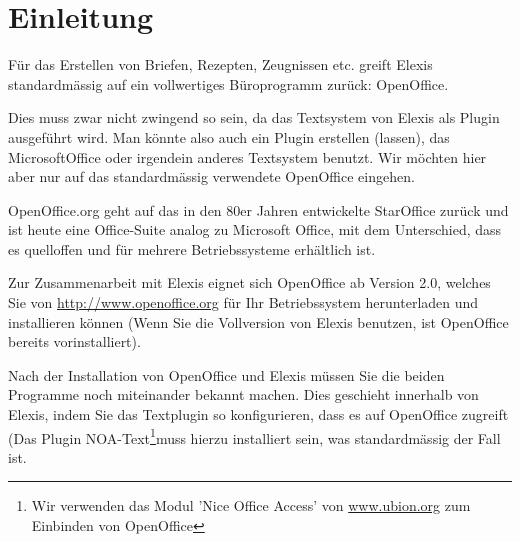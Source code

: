 
\section{Einleitung}
Für das Erstellen von Briefen, Rezepten, Zeugnissen etc. greift Elexis
standardmässig auf ein vollwertiges Büroprogramm zurück: OpenOffice.

Dies muss zwar nicht zwingend so sein, da das Textsystem von Elexis als Plugin
ausgeführt wird. Man könnte also auch ein Plugin erstellen (lassen), das
Microsoft\texttrademark{}Office\texttrademark{} oder irgendein anderes Textsystem
benutzt. Wir möchten hier aber nur auf das standardmässig verwendete OpenOffice
eingehen.

OpenOffice.org geht auf das in den 80er Jahren entwickelte StarOffice zurück und
ist heute eine Office-Suite analog zu Microsoft Office, mit dem Unterschied,
dass es quelloffen und für mehrere Betriebssysteme erhältlich ist.

Zur Zusammenarbeit mit Elexis eignet sich OpenOffice ab Version 2.0, welches Sie
von \href{http://www.openoffice.org}{http://www.openoffice.org} für Ihr
Betriebssystem herunterladen und installieren können (Wenn Sie die Vollversion
von Elexis benutzen, ist OpenOffice bereits vorinstalliert).

Nach der Installation von OpenOffice und Elexis müssen Sie die beiden Programme
noch miteinander bekannt machen. Dies geschieht innerhalb von Elexis, indem Sie
das Textplugin so konfigurieren, dass es auf OpenOffice zugreift (Das Plugin
\glqq NOA-Text\footnote{Wir verwenden das Modul 'Nice Office Access' von \href{http://www.ubion.org}{www.ubion.org}
 zum Einbinden von OpenOffice}\grqq{}muss hierzu installiert sein, was standardmässig der Fall ist.


